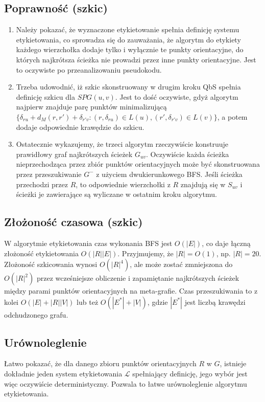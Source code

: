 \documentclass{article}
\theoremstyle{definition}
\begin{document}
    \subsection{Poprawność (szkic)}
    \begin{enumerate}
        \item Należy pokazać, że wyznaczone etykietowanie spełnia definicję systemu etykietowania, co sprowadza się do zauważania, że algorytm do etykiety każdego wierzchołka dodaje tylko i wyłącznie te punkty orientacyjne, do których najkrótsza ścieżka nie prowadzi przez inne punkty orientacyjne. Jest to oczywiste po przeanalizowaniu pseudokodu.  
        \item Trzeba udowodnić, iż szkic skonstruowany w drugim kroku QbS spełnia definicję szkicu dla $SPG(u,v)$. Jest to dość oczywiste, gdyż algorytm najpierw znajduje parę punktów minimalizującą $\{\delta_{ru} + d_M(r,r') + \delta_{r'v} : (r,\delta_{ru}) \in L(u), (r',\delta_{r'v}) \in L(v)\}$, a potem dodaje odpowiednie krawędzie do szkicu. 
        \item Ostatecznie wykazujemy, że trzeci algorytm rzeczywiście konstruuje prawidłowy graf najkrótszych ścieżek $G_{uv}$. Oczywiście każda ścieżka nieprzechodząca przez zbiór punktów orientacyjnych może być skonstruowana przez przeszukiwanie $G^{-}$ z użyciem dwukierunkowego BFS. Jeśli ścieżka przechodzi przez $R$, to odpowiednie wierzchołki z $R$ znajdują się w $S_{uv}$ i ścieżki je zawierające są wyliczane w ostatnim kroku algorytmu.  
    \end{enumerate}
        
    \subsection{Złożoność czasowa (szkic)}
        W algorytmie etykietowania czas wykonania BFS jest $O(|E|)$, co daje łączną złożoność etykietowania $O(|R||E|)$. Przyjmujemy, że $|R| = O(1)$, np. $|R| = 20$. Złożoność szkicowania wynosi $O(|R|^4)$, ale może zostać zmniejszona do $O(|R|^2)$ przez wcześniejsze obliczenie i zapamiętanie najkrótszych ścieżek między parami punktów orientacyjnych na meta-grafie. Czas przeszukiwania to z kolei $O(|E| + |R||V|)$ lub też $O(|E^{*}| + |V|)$, gdzie $|E^{*}|$ jest liczbą krawędzi odchudzonego grafu.
    \subsection{Urównoleglenie}
        Łatwo pokazać, że dla danego zbioru punktów orientacyjnych $R$ w $G$, istnieje dokładnie jeden system etykietowania $\mathcal{L}$ spełniający definicję, jego wybór jest więc oczywiście deterministyczny. Pozwala to łatwe urównoleglenie algorytmu etykietowania.
\end{document}
